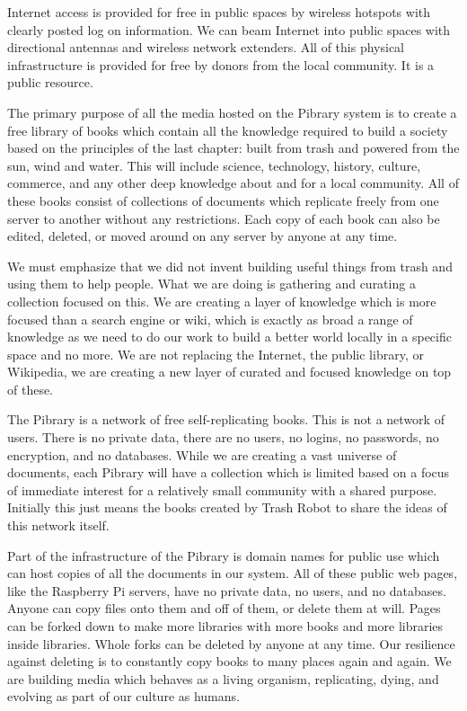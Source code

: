 Internet access is provided for free in public spaces by wireless
hotspots with clearly posted log on information. We can beam Internet
into public spaces with directional antennas and wireless network
extenders. All of this physical infrastructure is provided for free by
donors from the local community. It is a public resource.

The primary purpose of all the media hosted on the Pibrary system is to
create a free library of books which contain all the knowledge required
to build a society based on the principles of the last chapter: built
from trash and powered from the sun, wind and water. This will include
science, technology, history, culture, commerce, and any other deep
knowledge about and for a local community. All of these books consist of
collections of documents which replicate freely from one server to
another without any restrictions. Each copy of each book can also be
edited, deleted, or moved around on any server by anyone at any time.

We must emphasize that we did not invent building useful things from
trash and using them to help people. What we are doing is gathering and
curating a collection focused on this. We are creating a layer of
knowledge which is more focused than a search engine or wiki, which is
exactly as broad a range of knowledge as we need to do our work to build
a better world locally in a specific space and no more. We are not
replacing the Internet, the public library, or Wikipedia, we are
creating a new layer of curated and focused knowledge on top of these.

The Pibrary is a network of free self-replicating books. This is not a
network of users. There is no private data, there are no users, no
logins, no passwords, no encryption, and no databases. While we are
creating a vast universe of documents, each Pibrary will have a
collection which is limited based on a focus of immediate interest for a
relatively small community with a shared purpose. Initially this just
means the books created by Trash Robot to share the ideas of this
network itself.

Part of the infrastructure of the Pibrary is domain names for public use
which can host copies of all the documents in our system. All of these
public web pages, like the Raspberry Pi servers, have no private data,
no users, and no databases. Anyone can copy files onto them and off of
them, or delete them at will. Pages can be forked down to make more
libraries with more books and more libraries inside libraries. Whole
forks can be deleted by anyone at any time. Our resilience against
deleting is to constantly copy books to many places again and again. We
are building media which behaves as a living organism, replicating,
dying, and evolving as part of our culture as humans.

